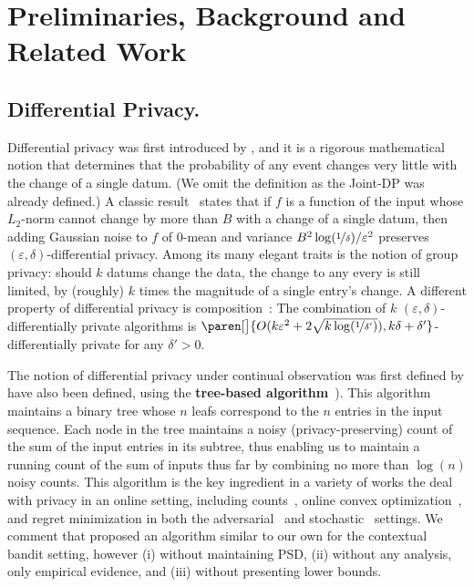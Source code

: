 \documentclass{article}
\DeclarePairedDelimiter{\paren}()
\begin{document}
\section{Preliminaries, Background and Related Work}
\label{sec:background}

\subsection{Differential Privacy.} Differential privacy was first introduced by
\citet{DworkCalibratingNoiseSensitivity2006,DworkOurData2006}, and it is a rigorous mathematical notion that determines that the probability of any event changes very little with the change of a single datum. (We omit the definition as the Joint-DP was already defined.) A classic result~\cite{DworkOurData2006} states that if $f$ is a function of the input whose $L_2$-norm cannot change by more than $B$ with a change of a single datum, then adding Gaussian noise to $f$ of $0$-mean and variance $B^2\log(\nicefrac 1 \delta)/\varepsilon^2$ preserves $(\varepsilon,\delta)$-differential privacy. Among its many elegant traits is the notion of group privacy: should $k$ datums change the data, the change to any every is still limited, by (roughly) $k$ times the magnitude of a single entry's change. A different property of differential privacy is composition~\cite{DworkBoosting2010}: The combination of $k$ $(\varepsilon,\delta)$-differentially private algorithms is $\paren[\big]{O(k\varepsilon^2 + 2\sqrt{k\log(\nicefrac 1 {\delta'})}), k\delta+\delta'}$-differentially private for any $\delta'>0$.

The notion of differential privacy under continual observation was
first defined by \citet{DworkContinualObservation2010} have also been
defined, using the \textbf{tree-based algorithm}~\citep[originally
appearing in][]{ChanPrivateContinualRelease2010}). This algorithm
maintains a binary tree whose $n$ leafs correspond to the $n$ entries
in the input sequence. Each node in the tree maintains a noisy
(privacy-preserving) count of the sum of the input entries in its
subtree, thus enabling us to maintain a running count of the sum of
inputs thus far by combining no more than $\log(n)$ noisy counts. This
algorithm is the key ingredient in a variety of works the deal with
privacy in an online setting, including
counts~\cite{DworkContinualObservation2010}, online convex
optimization~\cite{JainDPOnlineLearning2012}, and regret minimization
in both the
adversarial~\citep{SmithThakurtaPrivateOnlineLearning2013,TossouAchievingPrivacyAdversarial2017}
and
stochastic~\cite{MishraNearlyOptimalDPBandits2015,TossouAlgDPBandits2016}
settings. We comment that \citet{MishraNearlyOptimalDPBandits2015}
proposed an algorithm similar to our own for the contextual bandit
setting, however (i) without maintaining PSD, (ii) without any
analysis, only empirical evidence, and (iii) without presenting lower
bounds.
\end{document}
